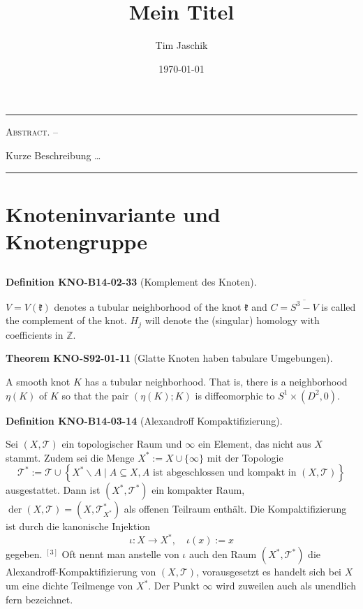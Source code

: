 \documentclass[10pt, letterpaper]{article}
\title{Mein Titel}
\author{Tim Jaschik}
\date{\today}
\renewenvironment{abstract}
  {
    \begin{adjustwidth}{1.5cm}{1.5cm}
    \small
    \textsc{Abstract. –}%
  }
  {
    \end{adjustwidth}
  }
\newcommand{\CustomHeading}[3]{%
  \par\medskip\noindent%
  \textbf{#1 #2} \textnormal{(#3)}.\enskip%
}
\newenvironment{DEF}[2]{\CustomHeading{Definition}{#1}{#2}}{}
\newenvironment{THEO}[2]{\CustomHeading{Theorem}{#1}{#2}}{}
\begin{document}
\maketitle
\rule{\textwidth}{0.5pt}
\begin{abstract}
Kurze Beschreibung …
\end{abstract}
\rule{\textwidth}{0.5pt}
\vspace{0.5cm}

\tableofcontents

\pagebreak

\section{Knoteninvariante und Knotengruppe}

\subsection{}

\begin{DEF}{KNO-B14-02-33}{Komplement des Knoten}
$V=V(\mathfrak{k})$ denotes a tubular neighborhood of the knot $\mathfrak{k}$ and $C=\overline{S^{3}-V}$ is called the complement of the knot. $H_{j}$ will denote the (singular) homology with coefficients in $\mathbb{Z}$.
\end{DEF}

\begin{THEO}{KNO-S92-01-11}{Glatte Knoten haben tabulare Umgebungen}
A smooth knot $K$ has a tubular neighborhood. That is, there is a neighborhood $\eta(K)$ of $K$ so that the pair $(\eta(K) ; K)$ is diffeomorphic to $S^{1} \times\left(D^{2}, 0\right)$.
\end{THEO}

\begin{DEF}{KNO-B14-03-14}{Alexandroff Kompaktifizierung}
Sei $(X, \mathcal{T})$ ein topologischer Raum und $\infty$ ein Element, das nicht aus $X$ stammt. Zudem sei die Menge $X^*:=X \cup\{\infty\}$ mit der Topologie
$$
\mathcal{T}^*:=\mathcal{T} \cup\left\{X^* \backslash A \mid A \subseteq X, A \text { ist abgeschlossen und kompakt in }(X, \mathcal{T})\right\}
$$
ausgestattet. Dann ist $\left(X^*, \mathcal{T}^*\right)$ ein kompakter Raum, $\operatorname{der}(X, \mathcal{T})=\left(X, \mathcal{T}_{X^*}^*\right)$ als offenen Teilraum enthält. Die Kompaktifizierung ist durch die kanonische Injektion
$$
\iota: X \rightarrow X^*, \quad \iota(x):=x
$$
gegeben. ${ }^{[3]}$ Oft nennt man anstelle von $\iota$ auch den Raum $\left(X^*, \mathcal{T}^*\right)$ die Alexandroff-Kompaktifizierung von $(X, \mathcal{T})$, vorausgesetzt es handelt sich bei $X$ um eine dichte Teilmenge von $X^*$.
Der Punkt $\infty$ wird zuweilen auch als unendlich fern bezeichnet.
\end{DEF}
\end{document}

